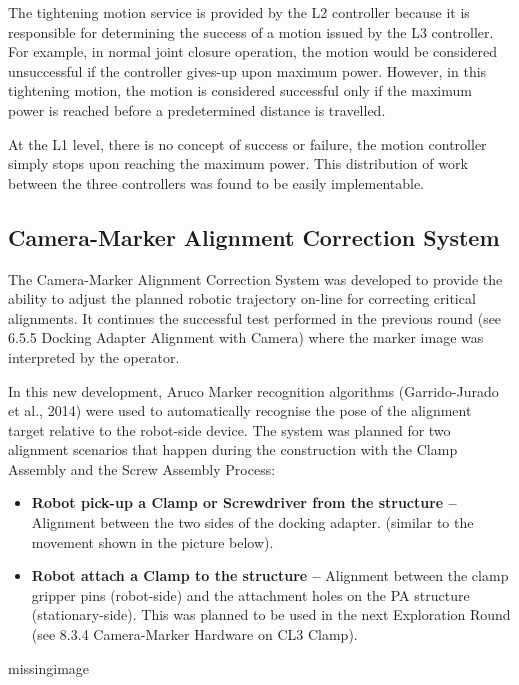 The tightening motion service is provided by the L2 controller because it is responsible for determining the success of a motion issued by the L3 controller. For example, in normal joint closure operation, the motion would be considered unsuccessful if the controller gives-up upon maximum power. However, in this tightening motion, the motion is considered successful only if the maximum power is reached before a predetermined distance is travelled. 

At the L1 level, there is no concept of success or failure, the motion controller simply stops upon reaching the maximum power. This distribution of work between the three controllers was found to be easily implementable.

\subsection{Camera-Marker Alignment Correction System}
\label{subsection:exploration_4_camera_marker_alignment_correction_system}

The Camera-Marker Alignment Correction System was developed to provide the ability to adjust the planned robotic trajectory on-line for correcting critical alignments. It continues the successful test performed in the previous round (see 6.5.5 Docking Adapter Alignment with Camera) where the marker image was interpreted by the operator. 

In this new development, Aruco Marker recognition algorithms (Garrido-Jurado et al., 2014) were used to automatically recognise the pose of the alignment target relative to the robot-side device. The system was planned for two alignment scenarios that happen during the construction with the Clamp Assembly and the Screw Assembly Process:

\begin{itemize}
    \item \textbf{Robot pick-up a Clamp or Screwdriver from the structure --} Alignment between the two sides of the docking adapter. (similar to the movement shown in the picture below).
    \item \textbf{Robot attach a Clamp to the structure --} Alignment between the clamp gripper pins (robot-side) and the attachment holes on the PA structure (stationary-side). This was planned to be used in the next Exploration Round (see 8.3.4 Camera-Marker Hardware on CL3 Clamp).
\end{itemize}

missingimage

